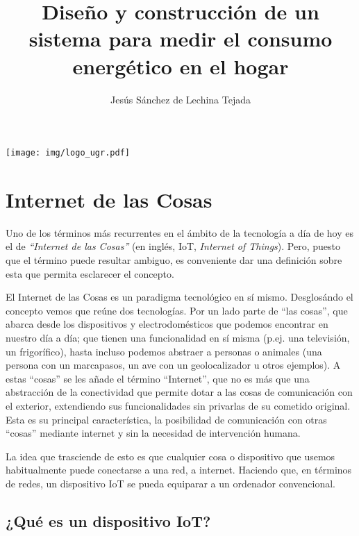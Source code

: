 \documentclass[a4paper,10pt]{article}
\title{Diseño y construcción de un sistema para medir el consumo
  energético en el hogar}
\author{Jesús Sánchez de Lechina Tejada}
\begin{document}
\maketitle
\thispagestyle{empty}
\begin{center}
  \texttt{[image: img/logo\_ugr.pdf]}
\end{center}
\newpage


\tableofcontents



\newpage

\section{Internet de las Cosas}\label{internet-de-las-cosas}

Uno de los términos más recurrentes en el ámbito de la tecnología a día
de hoy es el de \textit{``Internet de las Cosas''} (en inglés, IoT, \textit{Internet of
Things}). Pero, puesto que el término puede resultar ambiguo, es
conveniente dar una definición sobre esta que permita esclarecer el
concepto.

El Internet de las Cosas es un paradigma tecnológico en sí mismo.
Desglosándo el concepto vemos que reúne dos tecnologías. Por un lado
parte de ``las cosas'', que abarca desde los dispositivos y
electrodomésticos que podemos encontrar en nuestro día a día; que tienen
una funcionalidad en sí misma (p.ej. una televisión, un frigorífico),
hasta incluso podemos abstraer a personas o animales (una persona con un
marcapasos, un ave con un geolocalizador u otros ejemplos\cite{iotagendawebsiteWhatInternetThings}). A estas ``cosas'' se les añade el término
``Internet'', que no es más que una abstracción de la conectividad que
permite dotar a las cosas de comunicación con el exterior, extendiendo
sus funcionalidades sin privarlas de su cometido original. Esta es
su principal característica, la posibilidad de comunicación con otras
``cosas'' mediante internet y sin la necesidad de intervención humana.

La idea que trasciende de esto es que cualquier cosa o dispositivo que
usemos habitualmente puede conectarse a una red, a internet. Haciendo
que, en términos de redes, un dispositivo IoT se pueda equiparar a un
ordenador convencional.

\subsection{¿Qué es un dispositivo
IoT?}\label{quuxe9-es-un-dispositivo-iot}
\end{document}
